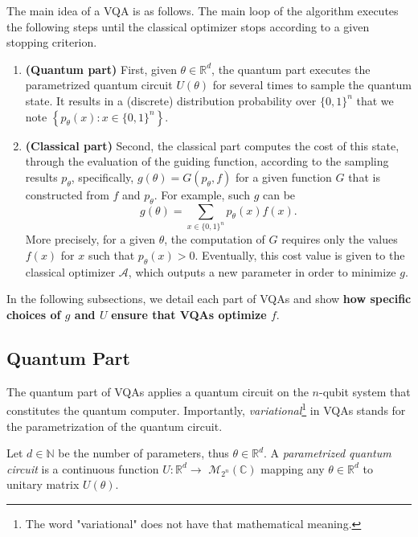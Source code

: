 The main idea of a VQA is as follows. The main loop of the algorithm executes the following steps until the classical optimizer stops according to a given stopping criterion. 

\begin{enumerate}
    \item \textbf{(Quantum part)} First, given $\theta \in \mathbb{R}^{d}$, the quantum part executes the parametrized quantum circuit $U(\theta)$ for several times to sample the quantum state. It results in a (discrete) distribution probability over $\{0,1\}^{n}$ that we note $\left\{p_{\theta}(x): x \in\{0,1\}^{n}\right\}$. %
    \item \textbf{(Classical part)} Second, the classical part computes the cost of this state, through the evaluation of the guiding function, according to the sampling results $p_{\theta}$, specifically, $g(\theta)=G\left(p_{\theta}, f\right)$ for a given function $G$ that is constructed from $f$ and $p_{\theta}$. For example, such $g$ can be
    \begin{equation}
    g(\theta)=\sum_{x \in\{0,1\}^n} p_\theta(x) f(x).
\end{equation}
    More precisely, for a given $\theta$, the computation of $G$ requires only the values $f(x)$ for $x$ such that $p_{\theta}(x)>0$. Eventually, this cost value is given to the classical optimizer $\mathcal{A}$, which outputs a new parameter in order to minimize $g$. %
\end{enumerate}

In the following subsections, we detail each part of VQAs and show \textbf{how specific choices of $g$ and $U$} \textbf{ensure that VQAs optimize $f$}.

\subsection{Quantum Part}

The quantum part of VQAs applies a quantum circuit on the $n$-qubit system that constitutes the quantum computer. Importantly, \textit{variational}\footnote{The word "variational" does not have that mathematical meaning.}  in VQAs stands for the parametrization of the quantum circuit. 

Let $d \in \mathbb{N}$ be the number of parameters, thus $\theta \in \mathbb{R}^d.$ A \textit{parametrized quantum circuit} is a continuous function $U: \mathbb{R}^{d} \rightarrow$ $\mathcal{M}_{2^{n}}(\mathbb{C})$ mapping any $\theta \in \mathbb{R}^{d}$ to unitary matrix $U(\theta)$.

